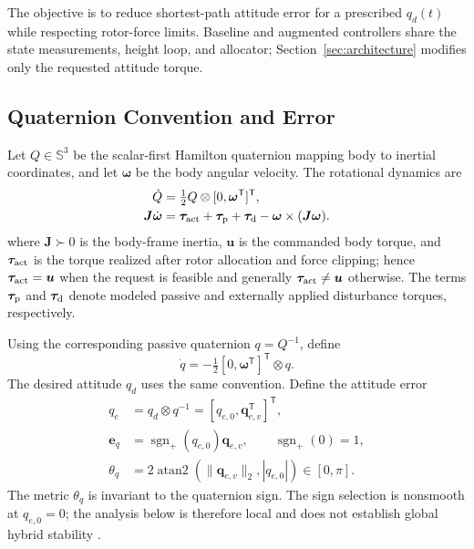 \documentclass[letterpaper, 10 pt, conference]{ieeeconf}
\newcommand{\T}{^{\mathsf T}}
\newcommand{\sgnp}{\operatorname{sgn}_{+}}
\begin{document}
The objective is to reduce shortest-path attitude error for a prescribed
$q_d(t)$ while respecting rotor-force limits. Baseline and augmented
controllers share the state measurements, height loop, and allocator;
Section~\ref{sec:architecture} modifies only the requested attitude torque.

%

\subsection{Quaternion Convention and Error}

Let $Q\in\mathbb S^3$ be the scalar-first Hamilton quaternion mapping body to
inertial coordinates, and let $\bm\omega$ be the body angular velocity. The
rotational dynamics are \cite{schaub2018amss}
\begin{align}
 \dot Q&=\tfrac12 Q\otimes[0,\bm\omega\T]\T,\\
 \bm J\dot{\bm\omega}&=\bm\tau_{\rm act}+\bm\tau_{\rm p}
       +\bm\tau_{\rm d}-\bm\omega\times(\bm J\bm\omega).
 \label{eq:plant}
\end{align}
where $\bm J\succ0$ is the body-frame inertia, $\bm u$ is the commanded
body torque, and $\bm\tau_{\rm act}$ is the torque realized after rotor
allocation and force clipping; hence $\bm\tau_{\rm act}=\bm u$ when the
request is feasible and generally $\bm\tau_{\rm act}\neq\bm u$ otherwise.
The terms $\bm\tau_{\rm p}$ and $\bm\tau_{\rm d}$ denote modeled passive and
externally applied disturbance torques, respectively.

Using the corresponding passive quaternion $q=Q^{-1}$, define
\begin{equation}
 \dot q=-\tfrac12[0,\bm\omega\T]\T\otimes q.
 \label{eq:passive}
\end{equation}
The desired attitude $q_d$ uses the same convention. Define the attitude error
\begin{align}
 q_e&=q_d\otimes q^{-1}=[q_{e,0},\bm q_{e,v}\T]\T,\\
 \bm e_q&=\sgnp(q_{e,0})\bm q_{e,v},\qquad \sgnp(0)=1,\\
 \theta_q&=2\operatorname{atan2}(\|\bm q_{e,v}\|_2,|q_{e,0}|)
             \in[0,\pi].
 \label{eq:theta}
\end{align}
The metric $\theta_q$ is invariant to the quaternion sign. The sign selection
is nonsmooth at $q_{e,0}=0$; the analysis below is therefore local and does
not establish global hybrid stability \cite{mayhew2011hybrid}.
\end{document}
